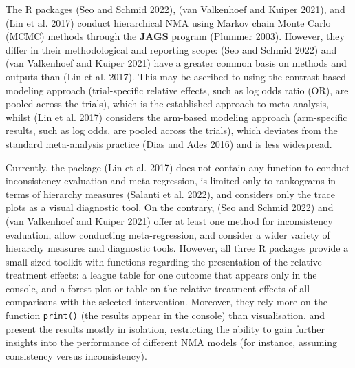 The R packages  (Seo and Schmid 2022),  (van Valkenhoef and Kuiper 2021), and 
(Lin et al. 2017) conduct hierarchical NMA using Markov chain Monte Carlo (MCMC) methods
through the \textbf{JAGS} program (Plummer 2003). However, they differ in their
methodological and reporting scope:  (Seo and Schmid 2022)
and  (van Valkenhoef and Kuiper 2021) have a greater common basis on methods and outputs
than  (Lin et al. 2017). This may be ascribed to using the contrast-based
modeling approach (trial-specific relative effects, such as log odds ratio (OR), are
pooled across the trials), which is the established approach to meta-analysis, whilst
 (Lin et al. 2017) considers the arm-based modeling approach
(arm-specific results, such as log odds, are pooled across the trials), which
deviates from the standard meta-analysis practice (Dias and Ades 2016) and is less widespread.

Currently, the package  (Lin et al. 2017) does not contain any
function to conduct inconsistency evaluation and meta-regression, is limited only
to rankograms in terms of hierarchy measures (Salanti et al. 2022), and considers only
the trace plots as a visual diagnostic tool. On the contrary,  (Seo and Schmid 2022)
and  (van Valkenhoef and Kuiper 2021) offer at least one method for inconsistency evaluation,
allow conducting meta-regression, and consider a wider variety of hierarchy measures
and diagnostic tools. However, all three R packages provide a small-sized toolkit
with functions regarding the presentation of the relative treatment effects: a league
table for one outcome that appears only in the console, and a forest-plot or table
on the relative treatment effects of all comparisons with the selected intervention.
Moreover, they rely more on the function \texttt{print()} (the results appear in the
console) than visualisation, and present the results mostly in isolation, restricting
the ability to gain further insights into the performance of different NMA models
(for instance, assuming consistency versus inconsistency).

